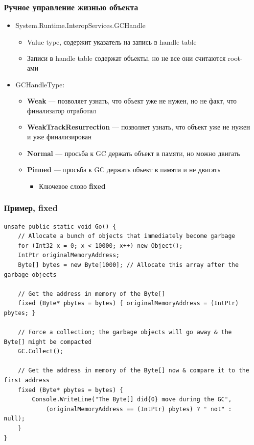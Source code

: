\documentclass[xetex,mathserif,serif]{beamer}
\begin{document}
	\begin{frame}
		\frametitle{Ручное управление жизнью объекта}
		\begin{itemize}
			\item System.Runtime.InteropServices.GCHandle
			\begin{itemize}
				\item Value type, содержит указатель на запись в handle table
				\item Записи в handle table содержат объекты, но не все они считаются root-ами
			\end{itemize}
			\item GCHandleType:
			\begin{itemize}
				\item \textbf{Weak} --- позволяет узнать, что объект уже не нужен, но не факт, что финализатор отработал
				\item \textbf{WeakTrackResurrection} --- позволяет узнать, что объект уже не нужен и уже финализирован
				\item \textbf{Normal} --- просьба к GC держать объект в памяти, но можно двигать
				\item \textbf{Pinned} --- просьба к GC держать объект в памяти и не двигать
				\begin{itemize}
					\item Ключевое слово \textbf{fixed}
				\end{itemize}
			\end{itemize}
		\end{itemize}
	\end{frame}

	\begin{frame}[fragile]
		\frametitle{Пример, fixed}
		\begin{scriptsize}
			\begin{verbatim}
unsafe public static void Go() {
    // Allocate a bunch of objects that immediately become garbage
    for (Int32 x = 0; x < 10000; x++) new Object();
    IntPtr originalMemoryAddress;
    Byte[] bytes = new Byte[1000]; // Allocate this array after the garbage objects

    // Get the address in memory of the Byte[]
    fixed (Byte* pbytes = bytes) { originalMemoryAddress = (IntPtr) pbytes; }

    // Force a collection; the garbage objects will go away & the Byte[] might be compacted
    GC.Collect();

    // Get the address in memory of the Byte[] now & compare it to the first address
    fixed (Byte* pbytes = bytes) {
        Console.WriteLine("The Byte[] did{0} move during the GC",
            (originalMemoryAddress == (IntPtr) pbytes) ? " not" : null);
    }
}
			\end{verbatim}
		\end{scriptsize}
	\end{frame}
\end{document}
